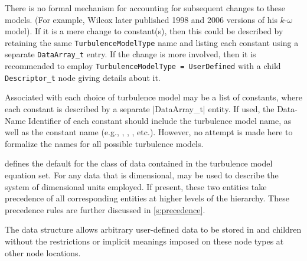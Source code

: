 There is no formal mechanism for accounting for subsequent changes to
these models.
(For example, Wilcox later published 1998 and 2006 versions of his
$k$-$\omega$ model).
If it is a mere change to constant(s), then this could be described by
retaining the same \texttt{TurbulenceModelType} name and listing each
constant using a separate \texttt{DataArray\_t} entry.
If the change is more involved, then it is recommended to
employ \texttt{TurbulenceModelType = UserDefined} with a child
\texttt{Descriptor\_t} node giving details about it.

Associated with each choice of turbulence model may be a list of constants,
where each constant is described by a separate |DataArray_t| entity.
If used, the Data-Name Identifier of each constant should include the
turbulence model name, as well as the constant name (e.g.,
, , ,
etc.).
However, no attempt is made here to formalize the names for all possible
turbulence models.

 defines the default for the class of data contained in the
turbulence model equation set.
For any data that is dimensional,  may be used to
describe the system of dimensional units employed.
If present, these two entities take precedence of all corresponding
entities at higher levels of the hierarchy.
These precedence rules are further discussed in \autoref{s:precedence}.

The  data structure allows arbitrary
user-defined data to be stored in  and
 children without the restrictions or implicit
meanings imposed on these node types at other node locations.

